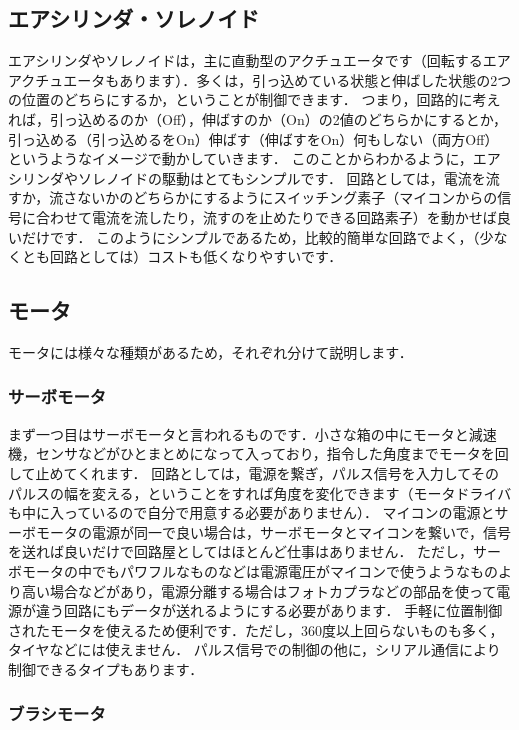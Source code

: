 \subsection{エアシリンダ・ソレノイド}

エアシリンダやソレノイドは，主に直動型のアクチュエータです（回転するエアアクチュエータもあります）．多くは，引っ込めている状態と伸ばした状態の2つの位置のどちらにするか，ということが制御できます．
つまり，回路的に考えれば，引っ込めるのか（Off），伸ばすのか（On）の2値のどちらかにするとか，引っ込める（引っ込めるをOn）伸ばす（伸ばすをOn）何もしない（両方Off）というようなイメージで動かしていきます．
このことからわかるように，エアシリンダやソレノイドの駆動はとてもシンプルです．
回路としては，電流を流すか，流さないかのどちらかにするようにスイッチング素子（マイコンからの信号に合わせて電流を流したり，流すのを止めたりできる回路素子）を動かせば良いだけです．
このようにシンプルであるため，比較的簡単な回路でよく，（少なくとも回路としては）コストも低くなりやすいです．

\subsection{モータ}

モータには様々な種類があるため，それぞれ分けて説明します．


\subsubsection{サーボモータ}

まず一つ目はサーボモータと言われるものです．小さな箱の中にモータと減速機，センサなどがひとまとめになって入っており，指令した角度までモータを回して止めてくれます．
回路としては，電源を繋ぎ，パルス信号を入力してそのパルスの幅を変える，ということをすれば角度を変化できます（モータドライバも中に入っているので自分で用意する必要がありません）．
マイコンの電源とサーボモータの電源が同一で良い場合は，サーボモータとマイコンを繋いで，信号を送れば良いだけで回路屋としてはほとんど仕事はありません．
ただし，サーボモータの中でもパワフルなものなどは電源電圧がマイコンで使うようなものより高い場合などがあり，電源分離する場合はフォトカプラなどの部品を使って電源が違う回路にもデータが送れるようにする必要があります．
手軽に位置制御されたモータを使えるため便利です．ただし，360度以上回らないものも多く，タイヤなどには使えません．
パルス信号での制御の他に，シリアル通信により制御できるタイプもあります．


\subsubsection{ブラシモータ}

